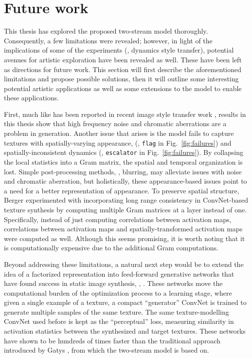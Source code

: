 \section{Future work}\label{sec:future_work}

This thesis has explored the proposed two-stream model thoroughly. Consequently, a few limitations were revealed; however, in light of the implications of some of the experiments (\eg, dynamics style transfer), potential avenues for artistic exploration have been revealed as well. These have been left as directions for future work. This section will first describe the aforementioned limitations and propose possible solutions, then it will outline some interesting potential artistic applications as well as some extensions to the model to enable these applications.

First, much like has been reported in recent image style transfer
work \cite{gatys2016image}, results in this thesis show that high frequency
noise and chromatic aberrations are a problem in generation. Another issue that arises is the model fails to capture
textures with spatially-varying appearance, (\eg, 
\texttt{flag} in Fig.\ \ref{fig:failures}) and
spatially-inconsistent dynamics (\eg, \texttt{escalator} in 
Fig.\ \ref{fig:failures}).
By collapsing the local statistics into a Gram matrix, 
the spatial and temporal organization is lost.
Simple post-processing methods, \eg, blurring, may alleviate issues with noise and chromatic aberration, but holistically, these appearance-based issues point to a need for a better representation of appearance. To preserve spatial structure, Berger \etal \cite{berger2016} experimented with incorporating long range consistency in ConvNet-based texture synthesis by computing multiple Gram matrices at a layer instead of one. Specifically, instead of just computing correlations between activation maps, correlations between activation maps and spatially-transformed activation maps were computed as well. Although this seems promising, it is worth noting that it is computationally expensive due to the additional Gram computations.

Beyond addressing these limitations, a natural next step would be
to extend the idea of a factorized representation into feed-forward
generative networks that have found success in static image
synthesis, \eg, \cite{johnson2016,ulyanov2016}. These networks move the computational burden of the optimization process to a learning stage, where given a single example of a texture, a compact ``generator'' ConvNet is trained to generate multiple samples of the same texture. The same texture-modelling ConvNet used before is kept as the ``perceptual'' loss, measuring similarity in activation statistics between the synthesized and target textures. These networks have shown to be hundreds of times faster than the traditional approach introduced by Gatys \etal \cite{gatys2015}, from which the two-stream model is based on.

